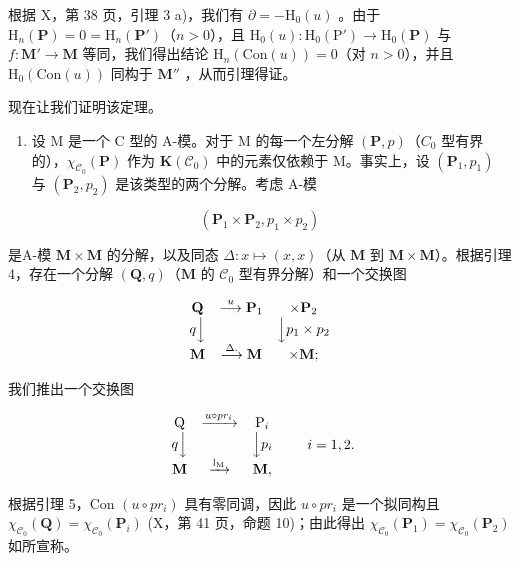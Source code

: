 根据 X，第 38 页，引理 3 a)，我们有 \(\partial = -\mathrm{H}_{0}(u)\) 。由于 \(\mathrm{H}_{n}(\mathbf{P}) = 0 = \mathrm{H}_{n}(\mathbf{P}')\)（\(n > 0\)），且 \(\mathrm{H}_{0}(u): \mathrm{H}_{0}(\mathrm{P}') \to \mathrm{H}_{0}(\mathbf{P})\) 与 \(f: \mathbf{M}' \to \mathbf{M}\) 等同，我们得出结论 \(\mathrm{H}_{n}(\mathrm{Con}(u)) = 0\)（对 \(n > 0\)），并且 \(\mathrm{H}_{0}(\mathrm{Con}(u))\) 同构于 \(\mathbf{M}''\) ，从而引理得证。

现在让我们证明该定理。

\begin{enumerate}
\def\labelenumi{\alph{enumi})}
\tightlist
\item
  设 M 是一个 C 型的 A-模。对于 M 的每一个左分解 \((\mathbf{P}, p)\)（\(C_{0}\) 型有界的），\(\chi_{\mathcal{C}_{0}}(\mathbf{P})\) 作为 \(\mathbf{K}(\mathcal{C}_{0})\) 中的元素仅依赖于 M。事实上，设 \((\mathbf{P}_{1}, p_{1})\) 与 \((\mathbf{P}_{2}, p_{2})\) 是该类型的两个分解。考虑 A-模
\end{enumerate}

\[
(\mathbf {P} _ {1} \times \mathbf {P} _ {2}, p _ {1} \times p _ {2})
\]

是A-模 \(\mathbf{M} \times \mathbf{M}\) 的分解，以及同态 \(\Delta : x \mapsto (x, x)\)（从 \(\mathbf{M}\) 到 \(\mathbf{M} \times \mathbf{M}\)）。根据引理 4，存在一个分解 \((\mathbf{Q}, q)\)（\(\mathbf{M}\) 的 \(\mathcal{C}_0\) 型有界分解）和一个交换图

\[
\begin{array}{c c c} \mathbf {Q} & \stackrel {{u}} {{\longrightarrow}} \mathbf {P} _ {1} & \times \mathbf {P} _ {2} \\ q \Big \downarrow & & \Big \downarrow p _ {1} \times p _ {2} \\ \mathbf {M} & \stackrel {{\Delta .}} {{\longrightarrow}} \mathbf {M} & \times \mathbf {M}; \end{array}
\]

我们推出一个交换图

\[
\begin{array}{c c c} \mathrm{Q} & \xrightarrow {u \circ p r _ {i}} & \mathrm{P} _ {i} \\ q \Big \downarrow & & \Big \downarrow p _ {i} \\ \mathbf {M} & \xrightarrow {\mathrm{l} _ {\mathrm{M}}} & \mathbf {M}, \end{array} \qquad i = 1, 2.
\]

根据引理 5，Con \((u \circ pr_i)\) 具有零同调，因此 \(u \circ pr_i\) 是一个拟同构且 \(\chi_{\mathcal{C}_0}(\mathbf{Q}) = \chi_{\mathcal{C}_0}(\mathbf{P}_i)\) (X，第 41 页，命题 10)；由此得出 \(\chi_{\mathcal{C}_0}(\mathbf{P}_1) = \chi_{\mathcal{C}_0}(\mathbf{P}_2)\) 如所宣称。

